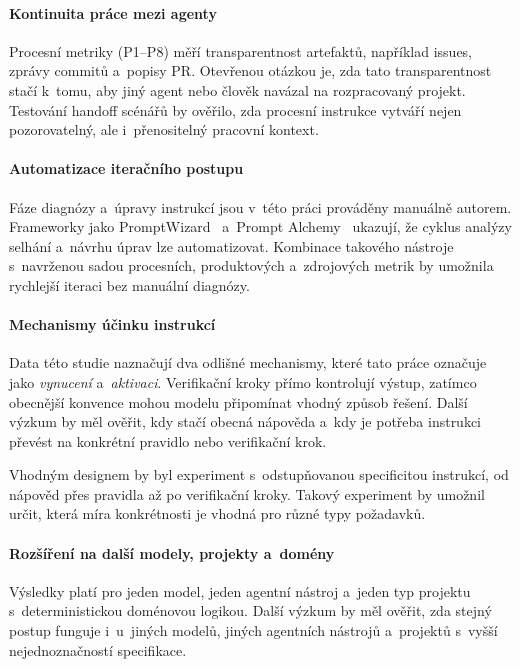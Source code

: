 \paragraph{Kontinuita práce mezi agenty}
Procesní metriky (\acs{P1}--\acs{P8}) měří transparentnost artefaktů,
například issues, zprávy commitů a~popisy PR. Otevřenou otázkou je, zda tato
transparentnost stačí k~tomu, aby jiný agent nebo člověk navázal na
rozpracovaný projekt. Testování handoff scénářů by ověřilo, zda
procesní instrukce vytváří nejen pozorovatelný, ale i~přenositelný
pracovní kontext.

\paragraph{Automatizace iteračního postupu}
Fáze diagnózy a~úpravy instrukcí jsou v~této práci prováděny
manuálně autorem. Frameworky jako
PromptWizard~\cite{agarwal2024promptwizard} a~Prompt
Alchemy~\cite{ye2025promptalchemy} ukazují, že cyklus analýzy
selhání a~návrhu úprav lze automatizovat. Kombinace takového
nástroje s~navrženou sadou procesních, produktových a~zdrojových
metrik by umožnila rychlejší iteraci bez manuální diagnózy.

\paragraph{Mechanismy účinku instrukcí}
Data této studie naznačují dva odlišné mechanismy, které tato práce
označuje jako \textit{vynucení} a~\textit{aktivaci}. Verifikační
kroky přímo kontrolují výstup, zatímco obecnější konvence mohou
modelu připomínat vhodný způsob řešení. Další výzkum by měl ověřit,
kdy stačí obecná nápověda a~kdy je potřeba instrukci převést na
konkrétní pravidlo nebo verifikační krok.

Vhodným designem by byl experiment s~odstupňovanou specificitou
instrukcí, od nápověd přes pravidla až po verifikační kroky. Takový
experiment by umožnil určit, která míra konkrétnosti je vhodná pro
různé typy požadavků.

\paragraph{Rozšíření na další modely, projekty a~domény}
Výsledky platí pro jeden model, jeden agentní nástroj a~jeden typ
projektu s~deterministickou doménovou logikou. Další výzkum by měl
ověřit, zda stejný postup funguje i~u~jiných modelů, jiných agentních
nástrojů a~projektů s~vyšší nejednoznačností specifikace.

